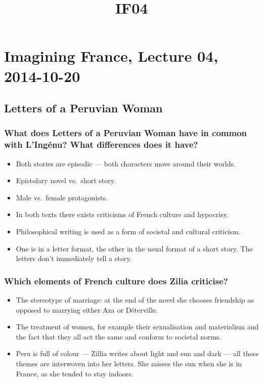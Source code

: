 \documentclass[12pt]{article}
\title{IF04}
\begin{document}
\section*{Imagining France, Lecture 04, 2014-10-20}

\subsection*{Letters of a Peruvian Woman}

\subsubsection*{What does Letters of a Peruvian Woman have in common with L'Ingénu? What differences does it have?}

\begin{itemize}
  \item{Both stories are episodic --- both characters move around their worlds.}
  \item{Epistolary novel vs.\ short story.}
  \item{Male vs.\ female protagonists.}
  \item{In both texts there exists criticisms of French culture and hypocrisy.}
  \item{Philosophical writing is used as a form of societal and cultural criticism.}
  \item{One is in a letter format, the other in the usual format of a short story. The letters don't immediately tell a story.}
\end{itemize}

\subsubsection*{Which elements of French culture does Zilia criticise?}

\begin{itemize}
  \item{The stereotype of marriage: at the end of the novel she chooses friendship as opposed to marrying either Aza or Déterville.}
  \item{The treatment of women, for example their sexualisation and materialism and the fact that they all act the same and conform to societal norms.}
   \item{Peru is full of colour --- Zillia writes about light and sun and dark --- all these themes are interwoven into her letters. She misses the sun when she is in France, as she tended to stay indoors.}
\end{itemize}
\end{document}
